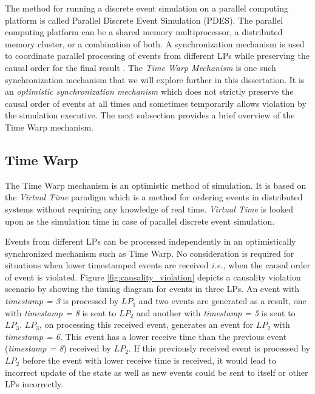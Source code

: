 \documentclass[11pt]{book}
\begin{document}
The method for running a discrete event simulation on a parallel computing platform is called Parallel
Discrete Event Simulation (PDES).  The parallel computing platform can be a shared memory multiprocessor, a
distributed memory cluster, or a combination of both.  A synchronization mechanism is used to coordinate
parallel processing of events from different LPs while preserving the causal order for the final result
\cite{lamport-78}.  The \emph{Time Warp Mechanism} \cite{jefferson-85,fujimoto-90,fujimoto-00} is one such
synchronization mechanism that we will explore further in this dissertation.  It is an \emph{optimistic
  synchronization mechanism} which does not strictly preserve the causal order of events at all times and
sometimes temporarily allows violation by the simulation executive.  The next subsection provides a brief
overview of the Time Warp mechanism.

\subsection{Time Warp}\label{subsec:timewarp}

The Time Warp mechanism is an optimistic method of simulation.  It is based on the \emph{Virtual Time}
paradigm \cite{jefferson-85} which is a method for ordering events in distributed systems without requiring
any knowledge of real time. \emph{Virtual Time} is looked upon as the simulation time in case of parallel
discrete event simulation.

Events from different LPs can be processed independently in an optimistically synchronized mechanism such as
Time Warp.  No consideration is required for situations when lower timestamped events are received
\emph{i.e.,} when the causal order of event is violated.  Figure \ref{fig:causality_violation} depicts a
causality violation scenario by showing the timing diagram for events in three LPs.  An event with
\emph{timestamp = 3} is processed by $LP_1$ and two events are generated as a result, one with \emph{timestamp
  = 8} is sent to $LP_2$ and another with \emph{timestamp = 5} is sent to $LP_3$.  $LP_3$, on processing this
received event, generates an event for $LP_2$ with \emph{timestamp = 6}.  This event has a lower receive time
than the previous event (\emph{timestamp = 8}) received by $LP_2$.  If this previously received event is
processed by $LP_2$ before the event with lower receive time is received, it would lead to incorrect update of
the state as well as new events could be sent to itself or other LPs incorrectly.
\end{document}
